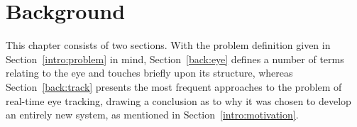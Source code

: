 
\cleardoublepage
\chapter{Background}
\label{back}

This chapter consists of two sections.  With the problem definition
given in Section~\ref{intro:problem} in mind, Section~\ref{back:eye}
defines a number of terms relating to the eye and touches briefly upon
its structure, whereas Section~\ref{back:track} presents the most
frequent approaches to the problem of real-time eye tracking, drawing
a conclusion as to why it was chosen to develop an entirely new
system, as mentioned in Section~\ref{intro:motivation}.



